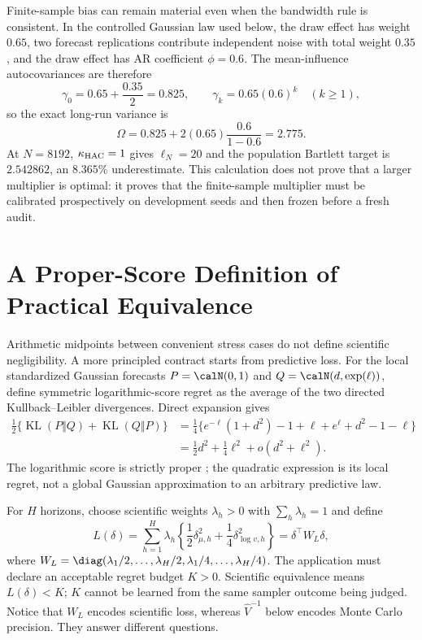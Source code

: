 Finite-sample bias can remain material even when the bandwidth rule is
consistent.  In the controlled Gaussian law used below, the draw effect has
weight $0.65$, two forecast replications contribute independent noise with
total weight $0.35$, and the draw effect has AR coefficient $\phi=0.6$.  The
mean-influence autocovariances are therefore
\begin{equation}
  \gamma_0=0.65+\frac{0.35}{2}=0.825,
  \qquad \gamma_k=0.65(0.6)^k\quad(k\geq1),
  \label{eq:bf-ssl-lstm-controlled-autocovariance}
\end{equation}
so the exact long-run variance is
\begin{equation}
  \Omega=0.825+2(0.65)\frac{0.6}{1-0.6}=2.775.
  \label{eq:bf-ssl-lstm-controlled-lrv}
\end{equation}
At $N=8192$, $\kappa_{\rm HAC}=1$ gives $\ell_N=20$ and the population
Bartlett target is $2.542862$, an $8.365\%$ underestimate.  This calculation
does not prove that a larger multiplier is optimal: it proves that the
finite-sample multiplier must be calibrated prospectively on development
seeds and then frozen before a fresh audit.

\section{A Proper-Score Definition of Practical Equivalence}
\label{sec:bf-ssl-lstm-proper-score-equivalence}

Arithmetic midpoints between convenient stress cases do not define scientific
negligibility.  A more principled contract starts from predictive loss.  For
the local standardized Gaussian forecasts
$P=\calN(0,1)$ and $Q=\calN(d,\exp(\ell))$, define symmetric logarithmic-score
regret as the average of the two directed Kullback--Leibler divergences.  Direct
expansion gives
\begin{align}
  \frac12\{\operatorname{KL}(P\Vert Q)+\operatorname{KL}(Q\Vert P)\}
  &=\frac14\{e^{-\ell}(1+d^2)-1+\ell
              +e^\ell+d^2-1-\ell\}                                      \\
  &=\frac12d^2+\frac14\ell^2
    +o(d^2+\ell^2).
  \label{eq:bf-ssl-lstm-local-score-regret}
\end{align}
The logarithmic score is strictly proper \citep{gneiting2007proper}; the
quadratic expression is its local regret, not a global Gaussian approximation
to an arbitrary predictive law.

For $H$ horizons, choose scientific weights $\lambda_h>0$ with
$\sum_h\lambda_h=1$ and define
\begin{equation}
  L(\delta)
  =\sum_{h=1}^H\lambda_h
    \left\{\frac12\delta_{\mu,h}^2
                 +\frac14\delta_{\log v,h}^2\right\}
  =\delta^\top W_L\delta,
  \label{eq:bf-ssl-lstm-scientific-loss}
\end{equation}
where
$W_L=\diag(\lambda_1/2,\ldots,\lambda_H/2,
           \lambda_1/4,\ldots,\lambda_H/4)$.
The application must declare an acceptable regret budget $K>0$.  Scientific
equivalence means $L(\delta)<K$; $K$ cannot be learned from the same sampler
outcome being judged.  Notice that $W_L$ encodes scientific loss, whereas
$\widehat V^{-1}$ below encodes Monte Carlo precision.  They answer different
questions.

